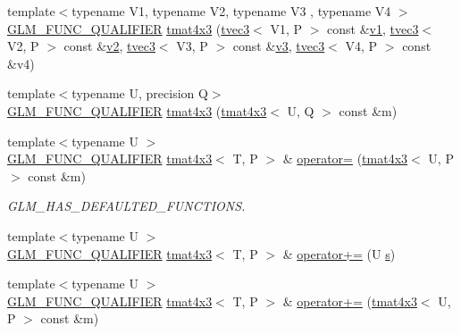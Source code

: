\begin{DoxyCompactItemize}
\item 
{\footnotesize template$<$typename V1, typename V2, typename V3 , typename V4 $>$ }\\\mbox{\hyperlink{setup_8hpp_a33fdea6f91c5f834105f7415e2a64407}{G\+L\+M\+\_\+\+F\+U\+N\+C\+\_\+\+Q\+U\+A\+L\+I\+F\+I\+ER}} \mbox{\hyperlink{structglm_1_1tmat4x3_a39c67aaaba4ee82e36a172a8704a4920}{tmat4x3}} (\mbox{\hyperlink{structglm_1_1tvec3}{tvec3}}$<$ V1, P $>$ const \&\mbox{\hyperlink{glad_8h_a0779c3b73f9aa3a0ac5b0139b5d291d9}{v1}}, \mbox{\hyperlink{structglm_1_1tvec3}{tvec3}}$<$ V2, P $>$ const \&\mbox{\hyperlink{glad_8h_a9a09a1837922b2b806f4589096a52049}{v2}}, \mbox{\hyperlink{structglm_1_1tvec3}{tvec3}}$<$ V3, P $>$ const \&\mbox{\hyperlink{glad_8h_acc806b31cbf466ceba6555983d8b814d}{v3}}, \mbox{\hyperlink{structglm_1_1tvec3}{tvec3}}$<$ V4, P $>$ const \&v4)
\item 
{\footnotesize template$<$typename U, precision Q$>$ }\\\mbox{\hyperlink{setup_8hpp_a33fdea6f91c5f834105f7415e2a64407}{G\+L\+M\+\_\+\+F\+U\+N\+C\+\_\+\+Q\+U\+A\+L\+I\+F\+I\+ER}} \mbox{\hyperlink{structglm_1_1tmat4x3_a977e48f213b5720e0c38342c955cfd3e}{tmat4x3}} (\mbox{\hyperlink{structglm_1_1tmat4x3}{tmat4x3}}$<$ U, Q $>$ const \&m)
\item 
{\footnotesize template$<$typename U $>$ }\\\mbox{\hyperlink{setup_8hpp_a33fdea6f91c5f834105f7415e2a64407}{G\+L\+M\+\_\+\+F\+U\+N\+C\+\_\+\+Q\+U\+A\+L\+I\+F\+I\+ER}} \mbox{\hyperlink{structglm_1_1tmat4x3}{tmat4x3}}$<$ T, P $>$ \& \mbox{\hyperlink{structglm_1_1tmat4x3_a45e2023a951f58d15675733993dd3f7a}{operator=}} (\mbox{\hyperlink{structglm_1_1tmat4x3}{tmat4x3}}$<$ U, P $>$ const \&m)
\begin{DoxyCompactList}\small\item\em G\+L\+M\+\_\+\+H\+A\+S\+\_\+\+D\+E\+F\+A\+U\+L\+T\+E\+D\+\_\+\+F\+U\+N\+C\+T\+I\+O\+NS. \end{DoxyCompactList}\item 
{\footnotesize template$<$typename U $>$ }\\\mbox{\hyperlink{setup_8hpp_a33fdea6f91c5f834105f7415e2a64407}{G\+L\+M\+\_\+\+F\+U\+N\+C\+\_\+\+Q\+U\+A\+L\+I\+F\+I\+ER}} \mbox{\hyperlink{structglm_1_1tmat4x3}{tmat4x3}}$<$ T, P $>$ \& \mbox{\hyperlink{structglm_1_1tmat4x3_a81802f6d7ccf5136033aa43964c05b51}{operator+=}} (U \mbox{\hyperlink{glad_8h_af1b1d5edfea6a34daee7389b1b5810ad}{s}})
\item 
{\footnotesize template$<$typename U $>$ }\\\mbox{\hyperlink{setup_8hpp_a33fdea6f91c5f834105f7415e2a64407}{G\+L\+M\+\_\+\+F\+U\+N\+C\+\_\+\+Q\+U\+A\+L\+I\+F\+I\+ER}} \mbox{\hyperlink{structglm_1_1tmat4x3}{tmat4x3}}$<$ T, P $>$ \& \mbox{\hyperlink{structglm_1_1tmat4x3_ac3328dbd930d4608781f9199cc793d17}{operator+=}} (\mbox{\hyperlink{structglm_1_1tmat4x3}{tmat4x3}}$<$ U, P $>$ const \&m)

\end{DoxyCompactItemize}

